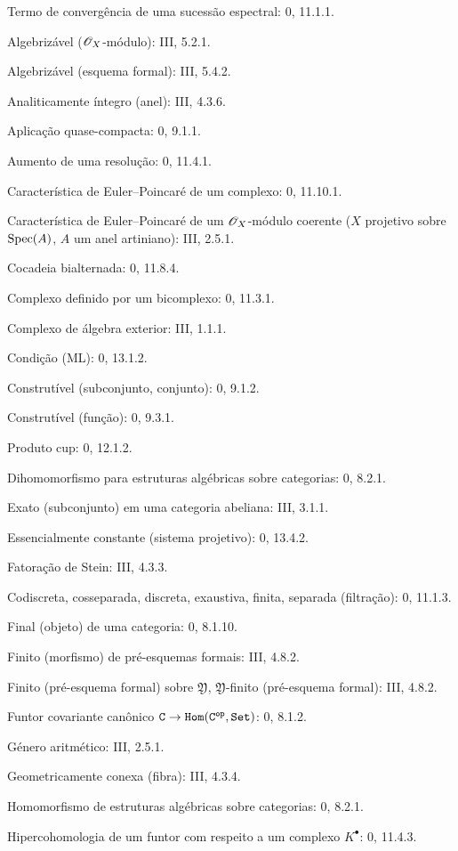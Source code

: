 \begin{flushleft}
Termo de convergência de uma sucessão espectral: 0, 11.1.1.

Algebrizável ($\mathscr{O}_X$-módulo): III, 5.2.1.

Algebrizável (esquema formal): III, 5.4.2.

Analiticamente íntegro (anel): III, 4.3.6.

Aplicação quase-compacta: 0, 9.1.1.

Aumento de uma resolução: 0, 11.4.1.

Característica de Euler--Poincaré de um complexo: 0, 11.10.1.

Característica de Euler--Poincaré de um $\mathscr{O}_X$-módulo coerente
($X$ projetivo sobre $\operatorname{Spec}(A)$, $A$ um anel artiniano): III, 2.5.1.

Cocadeia bialternada: 0, 11.8.4.

Complexo definido por um bicomplexo: 0, 11.3.1.

Complexo de álgebra exterior: III, 1.1.1.

Condição (ML): 0, 13.1.2.

Construtível (subconjunto, conjunto): 0, 9.1.2.

Construtível (função): 0, 9.3.1.

Produto cup: 0, 12.1.2.

Dihomomorfismo para estruturas algébricas sobre categorias: 0, 8.2.1.

Exato (subconjunto) em uma categoria abeliana: III, 3.1.1.

Essencialmente constante (sistema projetivo): 0, 13.4.2.

Fatoração de Stein: III, 4.3.3.

Codiscreta, cosseparada, discreta, exaustiva, finita, separada
(filtração): 0, 11.1.3.

Final (objeto) de uma categoria: 0, 8.1.10.

Finito (morfismo) de pré-esquemas formais: III, 4.8.2.

Finito (pré-esquema formal) sobre $\mathfrak Y$,
$\mathfrak Y$-finito (pré-esquema formal): III, 4.8.2.

Funtor covariante canônico $\C\to\CHom(\C\op,\Set)$: 0, 8.1.2.

Género aritmético: III, 2.5.1.

Geometricamente conexa (fibra): III, 4.3.4.

Homomorfismo de estruturas algébricas sobre categorias: 0, 8.2.1.

Hipercohomologia de um funtor com respeito a um complexo $K^\bullet$:
0, 11.4.3.


\end{flushleft}
